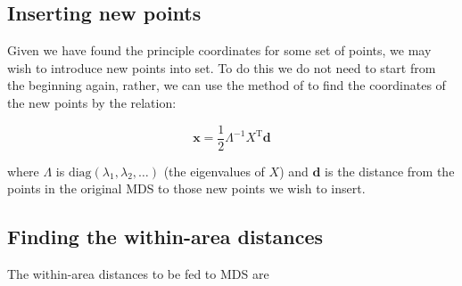 \documentclass[a4paper,10pt]{amsart}
\newcommand{\tr}[1]{#1^{\text{T}}}
\newcommand{\diag}{\text{diag}}
\begin{document}
\subsection{Inserting new points}

Given we have found the principle coordinates for some set of points, we may wish to introduce new points into set. To do this we do not need to start from the beginning again, rather, we can use the method of \cite{gower1968} to find the coordinates of the new points by the relation:

\begin{equation*}
\mathbf{x} = \frac{1}{2} \Lambda^{-1} \tr{X} \mathbf{d}
\end{equation*}

where $\Lambda$ is $\diag(\lambda_1, \lambda_2, \dots)$ (the eigenvalues of $X$) and $\mathbf{d}$ is the distance from the points in the original MDS to those new points we wish to insert.



\subsection{Finding the within-area distances}

The within-area distances to be fed to MDS are 





\end{document}

